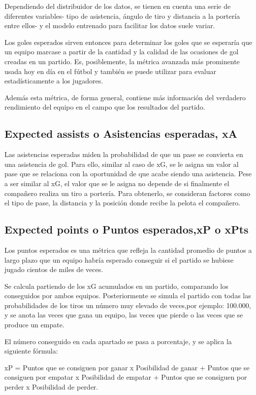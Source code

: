 Dependiendo del distribuidor de los datos, se tienen en cuenta una 
serie de diferentes variables- tipo de asistencia, ángulo de tiro y 
distancia a la portería entre ellos- y el modelo entrenado para 
facilitar los datos suele variar.

Los goles esperados sirven entonces para determinar 
los goles que se esperaría que un equipo marcase a partir de 
la cantidad y la calidad de las ocasiones de gol creadas en un 
partido. Es, posiblemente, la métrica avanzada más prominente 
usada hoy en día en el fútbol y también se puede utilizar para 
evaluar estadísticamente a los jugadores.

Además esta métrica, de forma general, contiene más información 
del verdadero rendimiento del equipo en el campo que los 
resultados del partido.

\subsection{Expected assists o Asistencias esperadas, xA}
Las asistencias esperadas miden la probabilidad de que un pase se 
convierta en una asistencia de gol. Para ello, similar al caso de xG, 
se le asigna un valor al pase que se relaciona con la oportunidad 
de que acabe siendo una asistencia. Pese a ser similar al xG, el 
valor que se le asigna no depende de si finalmente el compañero 
realiza un tiro a portería. Para obtenerlo, se consideran factores 
como el tipo de pase, la distancia y la posición donde recibe la 
pelota el compañero.

\subsection{Expected points o Puntos esperados,xP o xPts}
Los puntos esperados es una métrica que refleja la cantidad 
promedio de puntos a largo plazo que un equipo habría 
esperado conseguir si el partido se hubiese jugado cientos de miles de veces.

Se calcula partiendo de los xG acumulados en un partido, comparando 
los conseguidos por ambos equipos. Posteriormente se simula 
el partido con todas las probabilidades de los tiros un número 
muy elevado de veces,por ejemplo: 100.000, y se anota las veces 
que gana un equipo, las veces que pierde o las veces que 
se produce un empate.

El número conseguido en cada apartado se pasa a porcentaje, 
y se aplica la siguiente fórmula:

xP = Puntos que se consiguen por ganar x Posibilidad de ganar + 
     Puntos que se consiguen por empatar x Posibilidad de empatar + 
     Puntos que se consiguen por perder x Posibilidad de perder.


